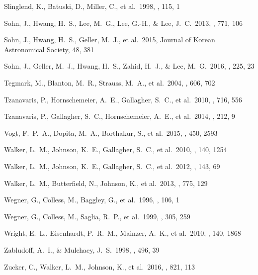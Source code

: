 \documentclass[12pt,preprint,apj]{emulateapj}
\begin{document}
\begin{thebibliography}{}
 Slinglend, K., Batuski, D., Miller, C., et al.\ 1998, \apjs, 115, 1 

 Sohn, J., Hwang, H.~S., Lee, M.~G., Lee, G.-H., \& Lee, J.~C.\ 2013, \apj, 771, 106

 Sohn, J., Hwang, H.~S., 
Geller, M.~J., et al.\ 2015, Journal of Korean Astronomical Society, 48, 
381 

 Sohn, J., Geller, M.~J., Hwang, H.~S., Zahid, H.~J., \& Lee, M.~G.\ 2016, \apjs, 225, 23

 Tegmark, M., Blanton, M.~R., Strauss, M.~A., et al.\ 2004, \apj, 606, 702  

 Tzanavaris, P., Hornschemeier, A.~E., Gallagher, S.~C., et al.\ 2010, \apj, 716, 556

 Tzanavaris, P., Gallagher, S.~C., Hornschemeier, A.~E., et al.\ 2014, \apjs, 212, 9

 Vogt, F.~P.~A., Dopita, 
M.~A., Borthakur, S., et al.\ 2015, \mnras, 450, 2593
 
 Walker, L.~M., Johnson, 
K.~E., Gallagher, S.~C., et al.\ 2010, \aj, 140, 1254

 Walker, L.~M., Johnson, 
K.~E., Gallagher, S.~C., et al.\ 2012, \aj, 143, 69

 Walker, L.~M., Butterfield, N., Johnson, K., et al.\ 2013, \apj, 775, 129



 Wegner, G., Colless, M., Baggley, G., et al.\ 1996, \apjs, 106, 1

 Wegner, G., Colless, M., Saglia, R.~P., et al.\ 1999, \mnras, 305, 259

 Wright, E.~L., Eisenhardt, P.~R.~M., Mainzer, A.~K., et al.\ 2010, \aj, 140, 1868

 Zabludoff, A.~I., \& Mulchaey, J.~S.\ 1998, \apj, 496, 39

 Zucker, C., Walker, L.~M., Johnson, K., et al.\ 2016, \apj, 821, 113 

\end{thebibliography}
\end{document}
